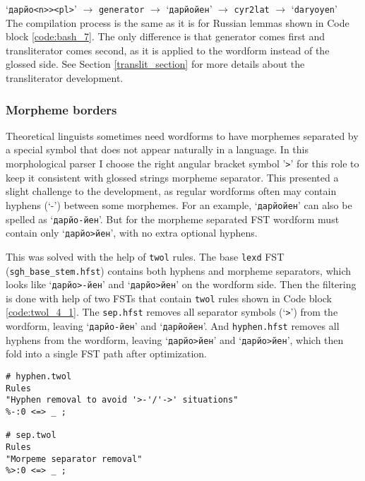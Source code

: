 \vspace*{0.3cm}
\noindent `\texttt{дарйо<n>><pl>}' $\rightarrow$ \texttt{generator} $\rightarrow$ `\texttt{дарйойен}' $\rightarrow$ \texttt{cyr2lat} $\rightarrow$ `\texttt{daryoyen}'\\

The compilation process is the same as it is for Russian lemmas shown in Code block \ref{code:bash_7}. The only difference is that generator comes first and transliterator comes second, as it is applied to the wordform instead of the glossed side. See Section \ref{translit_section} for more details about the transliterator development.

\subsubsection*{Morpheme borders}
Theoretical linguists sometimes need wordforms to have morphemes separated by a special symbol that does not appear naturally in a language. In this morphological parser I choose the right angular bracket symbol '\texttt{>}' for this role to keep it consistent with glossed strings morpheme separator. This presented a slight challenge to the development, as regular wordforms often may contain hyphens (`-') between some morphemes. For an example, `\texttt{дарйойен}' can also be spelled as `\texttt{дарйо-йен}'. But for the morpheme separated FST wordform must contain only `\texttt{дарйо>йен}', with no extra optional hyphens. 

This was solved with the help of \texttt{twol} rules. The base \texttt{lexd} FST (\texttt{sgh\_base\_stem.hfst}) contains both hyphens and morpheme separators, which looks like `\texttt{дарйо>-йен}' and `\texttt{дарйо>йен}' on the wordform side. Then the filtering is done with help of two FSTs that contain \texttt{twol} rules shown in Code block \ref{code:twol_4_1}. The \texttt{sep.hfst} removes all separator symbols (`\texttt{>}') from the wordform, leaving `\texttt{дарйо-йен}' and `\texttt{дарйойен}'. And \texttt{hyphen.hfst} removes all hyphens from the wordform, leaving `\texttt{дарйо>йен}' and `\texttt{дарйо>йен}', which then fold into a single FST path after optimization.

\begin{code_frame}[float]
    \begin{verbatim}
# hyphen.twol
Rules
"Hyphen removal to avoid '>-'/'->' situations"
%-:0 <=> _ ;

# sep.twol
Rules
"Morpeme separator removal"
%>:0 <=> _ ;
    \end{verbatim}
    \tcblower
    \label{code:twol_4_1}
\end{code_frame}

